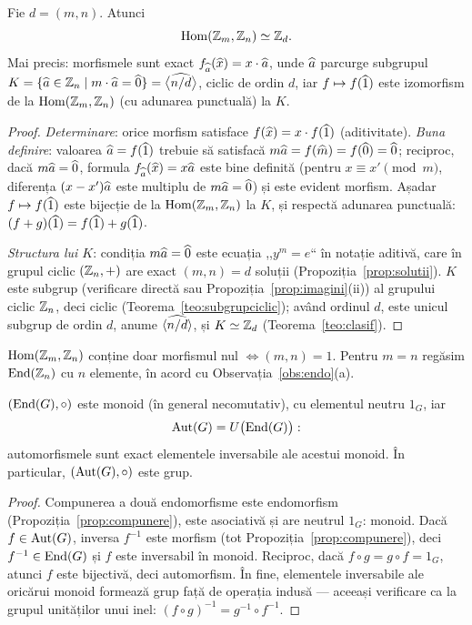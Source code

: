\begin{teorema}[{$\Hom(\ZZ_m,\ZZ_n)$}]\label{teo:homZmZn}
Fie $d=(m,n)$. Atunci
\[
\operatorname{Hom}(\mathbb{Z}_m,\mathbb{Z}_n)\simeq\mathbb{Z}_{d}.
\]
Mai precis: morfismele sunt exact $f_{\widehat{a}}(\widehat{x})=x\cdot\widehat{a}$, unde $\widehat{a}$ parcurge subgrupul
$K=\{\widehat{a}\in\mathbb{Z}_n\mid m\cdot\widehat{a}=\widehat{0}\}=\bigl\langle\widehat{n/d}\bigr\rangle$, ciclic de ordin $d$, iar $f\mapsto f(\widehat{1})$ este izomorfism de la $\Hom(\ZZ_m,\ZZ_n)$ (cu adunarea punctuală) la $K$.
\end{teorema}

\begin{proof}
\emph{Determinare}: orice morfism satisface $f(\widehat{x})=x\cdot f(\widehat{1})$ (aditivitate). \emph{Buna definire}: valoarea $\widehat{a}=f(\widehat{1})$ trebuie să satisfacă $m\widehat{a}=f(\widehat{m})=f(\widehat{0})=\widehat{0}$; reciproc, dacă $m\widehat{a}=\widehat{0}$, formula $f_{\widehat{a}}(\widehat{x})=x\widehat{a}$ este bine definită (pentru $x\equiv x'\pmod m$, diferența $(x-x')\widehat{a}$ este multiplu de $m\widehat{a}=\widehat{0}$) și este evident morfism. Așadar $f\mapsto f(\widehat{1})$ este bijecție de la $\Hom(\ZZ_m,\ZZ_n)$ la $K$, și respectă adunarea punctuală: $(f+g)(\widehat{1})=f(\widehat{1})+g(\widehat{1})$.

\emph{Structura lui $K$}: condiția $m\widehat{a}=\widehat{0}$ este ecuația ,,$y^m=e$`` în notație aditivă, care în grupul ciclic $(\mathbb{Z}_n,+)$ are exact $(m,n)=d$ soluții (Propoziția~\ref{prop:solutii}). $K$ este subgrup (verificare directă sau Propoziția~\ref{prop:imagini}(ii)) al grupului ciclic $\mathbb{Z}_n$, deci ciclic (Teorema~\ref{teo:subgrupciclic}); având ordinul $d$, este unicul subgrup de ordin $d$, anume $\langle\widehat{n/d}\rangle$, și $K\simeq\mathbb{Z}_d$ (Teorema~\ref{teo:clasif}).
\end{proof}

\begin{corolar}
$\Hom(\ZZ_m,\ZZ_n)$ conține doar morfismul nul $\iff(m,n)=1$. Pentru $m=n$ regăsim $\operatorname{End}(\mathbb{Z}_n)$ cu $n$ elemente, în acord cu Observația~\ref{obs:endo}(a).
\end{corolar}

\begin{propozitie}[{$\End(G)$ ca monoid; $\Aut(G)=U(\End(G))$}]\label{prop:endmonoid}
$(\operatorname{End}(G),\circ)$ este monoid (în general necomutativ), cu elementul neutru $1_G$, iar
\[
\operatorname{Aut}(G)=U\bigl(\operatorname{End}(G)\bigr):
\]
automorfismele sunt exact elementele inversabile ale acestui monoid. În particular, $(\operatorname{Aut}(G),\circ)$ este grup.
\end{propozitie}

\begin{proof}
Compunerea a două endomorfisme este endomorfism (Propoziția~\ref{prop:compunere}), este asociativă și are neutrul $1_G$: monoid. Dacă $f\in\operatorname{Aut}(G)$, inversa $f^{-1}$ este morfism (tot Propoziția~\ref{prop:compunere}), deci $f^{-1}\in\operatorname{End}(G)$ și $f$ este inversabil în monoid. Reciproc, dacă $f\circ g=g\circ f=1_G$, atunci $f$ este bijectivă, deci automorfism. În fine, elementele inversabile ale oricărui monoid formează grup față de operația indusă --- aceeași verificare ca la grupul unităților unui inel: $(f\circ g)^{-1}=g^{-1}\circ f^{-1}$.
\end{proof}

